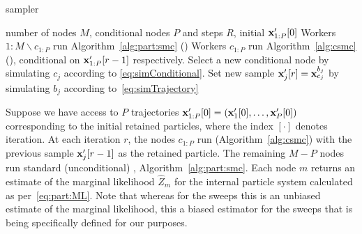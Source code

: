 \begin{algorithm}[tb]
	\caption{\ipmcmc sampler}
	\label{alg:ipmc}
	\begin{spacing}{1.2}
	\begin{algorithmic}[1]
		\renewcommand{\algorithmicrequire}{\textbf{Inputs:}}
		\renewcommand{\algorithmicensure}{\textbf{Outputs:}}				 
		\Require number of nodes $M$, conditional nodes $P$ and \mcmc steps $R$, initial $\mathbf{x}_{1:P}'[0]$
		\State Workers $1:M \backslash c_{1:P}$ run Algorithm~\ref{alg:part:smc} (\smc)
		\State Workers $c_{1:P}$ run Algorithm~\ref{alg:csmc} (\csmc), conditional on $\mathbf{x}_{1:P}'[r-1]$ respectively.
		\State Select a new conditional node by simulating $c_j$ according to \eqref{eq:simConditional}. %
		\State Set new \mcmc sample $\mathbf{x}_j'[r] = \mathbf{x}_{c_j}^{b_j}$ by simulating $b_j$ according to~\eqref{eq:simTrajectory}
		\EndFor
		\EndFor
	\end{algorithmic}
\end{spacing}
\end{algorithm}

Suppose we have access to $P$ trajectories ${\mathbf{x}_{1:P}'[0]=(\mathbf{x}_1'[0],\ldots,\mathbf{x}_P'[0])}$ corresponding to the initial retained particles, where the index $[\cdot]$ denotes \mcmc iteration. At each iteration $r$, the nodes $c_{1:P}$ run \csmc (Algorithm~\ref{alg:csmc}) with the previous \mcmc sample $\mathbf{x}_j'[r-1]$ as the retained particle. The remaining $M-P$ nodes run standard (unconditional) \smc, \ie Algorithm~\ref{alg:part:smc}.  Each node $m$ returns an estimate of the marginal likelihood $\hat Z_{m} $ for the internal particle system
calculated as per~\eqref{eq:part:ML}.  Note that whereas for the \smc sweeps this is an unbiased estimate of the 
marginal likelihood, this a biased estimator for the \csmc sweeps that is being specifically defined for our purposes.

